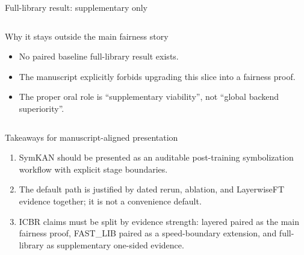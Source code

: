 \documentclass[aspectratio=169,10pt]{beamer}
\begin{document}
\begin{frame}{Full-library result: supplementary only}
  \begin{columns}[T,onlytextwidth]
      \vspace{0.25cm}
      \vspace{0.25cm}
      \begin{block}{Why it stays outside the main fairness story}
        \begin{itemize}
          \item No paired baseline full-library result exists.
          \item The manuscript explicitly forbids upgrading this slice into a fairness proof.
          \item The proper oral role is “supplementary viability”, not “global backend superiority”.
        \end{itemize}
      \end{block}
  \end{columns}
\end{frame}

\begin{frame}{Takeaways for manuscript-aligned presentation}
  \begin{enumerate}
    \item SymKAN should be presented as an auditable post-training symbolization workflow with explicit stage boundaries.
    \item The default path is justified by dated rerun, ablation, and LayerwiseFT evidence together; it is not a convenience default.
    \item ICBR claims must be split by evidence strength: layered paired as the main fairness proof, FAST\_LIB paired as a speed-boundary extension, and full-library as supplementary one-sided evidence.
  \end{enumerate}
  \vspace{0.5cm}
\end{frame}
\end{document}

